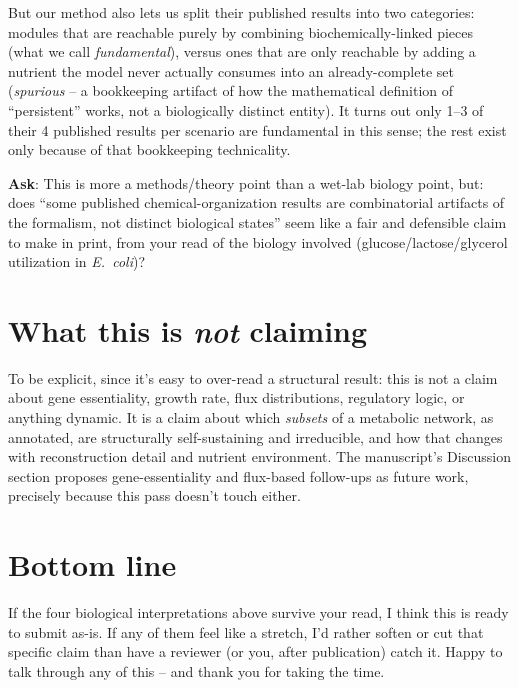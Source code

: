 \documentclass[11pt]{article}
\begin{document}
But our method also lets us split their published results into two categories: modules that are reachable purely by combining biochemically-linked pieces (what we call \emph{fundamental}), versus ones that are only reachable by adding a nutrient the model never actually consumes into an already-complete set (\emph{spurious} -- a bookkeeping artifact of how the mathematical definition of ``persistent'' works, not a biologically distinct entity). It turns out only 1--3 of their 4 published results per scenario are fundamental in this sense; the rest exist only because of that bookkeeping technicality.

\textbf{Ask}: This is more a methods/theory point than a wet-lab biology point, but: does ``some published chemical-organization results are combinatorial artifacts of the formalism, not distinct biological states'' seem like a fair and defensible claim to make in print, from your read of the biology involved (glucose/lactose/glycerol utilization in \textit{E.\ coli})?

\section*{What this is \emph{not} claiming}
To be explicit, since it's easy to over-read a structural result: this is not a claim about gene essentiality, growth rate, flux distributions, regulatory logic, or anything dynamic. It is a claim about which \emph{subsets} of a metabolic network, as annotated, are structurally self-sustaining and irreducible, and how that changes with reconstruction detail and nutrient environment. The manuscript's Discussion section proposes gene-essentiality and flux-based follow-ups as future work, precisely because this pass doesn't touch either.

\section*{Bottom line}
If the four biological interpretations above survive your read, I think this is ready to submit as-is. If any of them feel like a stretch, I'd rather soften or cut that specific claim than have a reviewer (or you, after publication) catch it. Happy to talk through any of this -- and thank you for taking the time.
\end{document}
